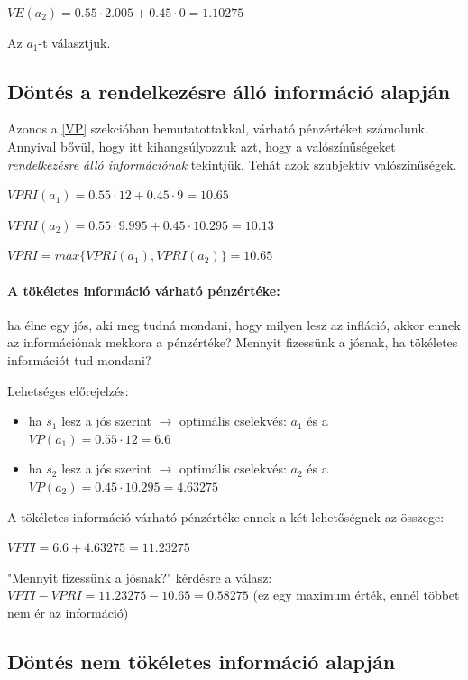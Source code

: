 \documentclass[a4paper,12pt]{article}
\begin{document}
$VE(a_2) = 0.55\cdot 2.005 + 0.45\cdot 0 = 1.10275$

Az $a_1$-t választjuk.

\subsection{Döntés a rendelkezésre álló információ alapján}
Azonos a \ref{VP} szekcióban bemutatottakkal, várható pénzértéket számolunk. Annyival bővül, hogy itt kihangsúlyozzuk azt, hogy a valószínűségeket \emph{rendelkezésre álló információnak} tekintjük. Tehát azok szubjektív valószínűségek.

$VPRI(a_1) = 0.55\cdot 12 + 0.45\cdot 9 = 10.65$

$VPRI(a_2) = 0.55\cdot 9.995 + 0.45\cdot 10.295 = 10.13$

$VPRI = max\{VPRI(a_1), VPRI(a_2)\} = 10.65$

\paragraph{A tökéletes információ várható pénzértéke: } ha élne egy jós, aki meg tudná mondani, hogy milyen lesz az infláció, %
akkor ennek az információnak mekkora a pénzértéke? Mennyit fizessünk a jósnak, ha tökéletes információt tud mondani?

Lehetséges előrejelzés:
\begin{itemize}
\item ha $s_{1}$ lesz a jós szerint $\rightarrow$ optimális cselekvés: $a_1$  és a $VP(a_1) = 0.55\cdot 12 = 6.6$
\item ha $s_{2}$ lesz a jós szerint $\rightarrow$ optimális cselekvés: $a_2$  és a $VP(a_2) = 0.45\cdot 10.295 = 4.63275$
\end{itemize}

A tökéletes információ várható pénzértéke ennek a két lehetőségnek az összege: 

$VPTI = 6.6 + 4.63275 = 11.23275$

"Mennyit fizessünk a jósnak?" kérdésre a válasz: $VPTI - VPRI = 11.23275 - 10.65 = 0.58275$ (ez egy maximum érték, ennél többet nem ér az információ)

\subsection{Döntés nem tökéletes információ alapján}
\end{document}
